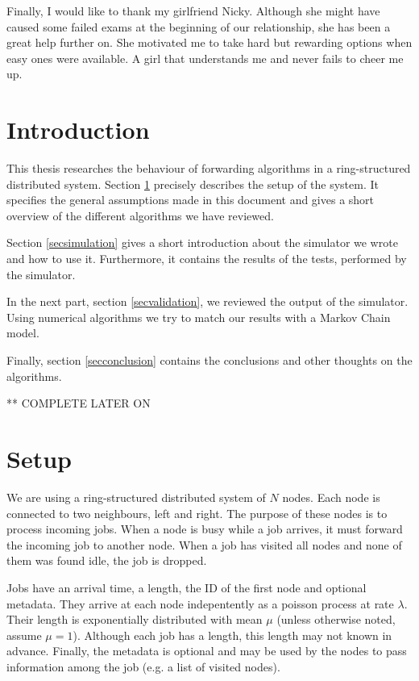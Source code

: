 \documentclass[10pt,a4paper]{article}
\begin{document}
Finally, I would like to thank my girlfriend Nicky. Although she might have caused some failed exams at the beginning of our relationship, she has been a great help further on. She motivated me to take hard but rewarding options when easy ones were available. A girl that understands me and never fails to cheer me up.



\newpage

\tableofcontents

\newpage

\section*{Introduction}
This thesis researches the behaviour of forwarding algorithms in a ring-structured distributed system. Section \ref{secsetup} precisely describes the setup of the system. It specifies the general assumptions made in this document and gives a short overview of the different algorithms we have reviewed.

Section \ref{secsimulation} gives a short introduction about the simulator we wrote and how to use it. Furthermore, it contains the results of the tests, performed by the simulator.

In the next part, section \ref{secvalidation}, we reviewed the output of the simulator. Using numerical algorithms we try to match our results with a Markov Chain model.

Finally, section \ref{secconclusion} contains the conclusions and other thoughts on the algorithms.

** COMPLETE LATER ON

\section{Setup}
\label{secsetup}
We are using a ring-structured distributed system of $N$ nodes. Each node is connected to two neighbours, left and right. The purpose of these nodes is to process incoming jobs. When a node is busy while a job arrives, it must forward the incoming job to another node. When a job has visited all nodes and none of them was found idle, the job is dropped.

Jobs have an arrival time, a length, the ID of the first node and optional metadata. They arrive at each node indepentently as a poisson process at rate $\lambda$. Their length is exponentially distributed with mean $\mu$ (unless otherwise noted, assume $\mu=1$). Although each job has a length, this length may not known in advance. Finally, the metadata is optional and may be used by the nodes to pass information among the job (e.g. a list of visited nodes).
\end{document}
